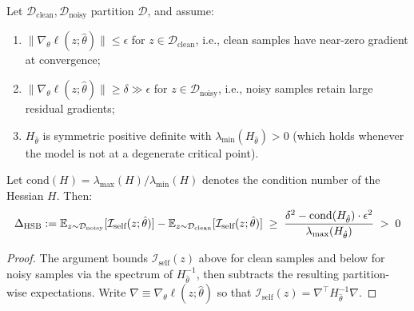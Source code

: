 \begin{foldable} %
    \begin{proposition} \label{prop:hsb}
        Let $\mathcal{D}_\text{clean}, \mathcal{D}_\text{noisy}$ partition $\mathcal{D}$, and assume:
        \begin{enumerate}[label=\textbf{(A\arabic*)},leftmargin=*]
            \item $\|\nabla_\theta \ell(z; \hat{\theta})\| \leq \epsilon$ for $z \in \mathcal{D}_\text{clean}$, i.e., clean samples have near-zero gradient at convergence;
            \item $\|\nabla_\theta \ell(z; \hat{\theta})\| \geq \delta \gg \epsilon$ for $z \in \mathcal{D}_\text{noisy}$, i.e., noisy samples retain large residual gradients;
            \item $H_{\hat\theta}$ is symmetric positive definite with $\lambda_{\min}(H_{\hat\theta}) > 0$ (which holds whenever the model is not at a degenerate critical point).
        \end{enumerate}
        Let $\text{cond}(H) = \lambda_{\max}(H) / \lambda_{\min}(H)$ denotes the condition number of the Hessian $H$.
        Then:
        \begin{equation}
            \Delta_\textup{HSB} := \mathbb{E}_{z \sim \mathcal{D}_\textup{noisy}}[\mathcal{I}_\textup{self}(z;\hat{\theta})]
            - \mathbb{E}_{z \sim \mathcal{D}_\textup{clean}}[\mathcal{I}_\textup{self}(z;\hat{\theta})]
            \;\geq\; \frac{\delta^2 - \text{cond}(H_{\hat{\theta}}) \cdot \epsilon^2}{\lambda_{\max}(H_{\hat{\theta}})}
            \;>\; 0
            \label{eq:hsb}
        \end{equation}
    \end{proposition}
    \begin{proof}
        The argument bounds $\mathcal{I}_\text{self}(z)$ above for clean samples and below for noisy samples via the spectrum of $H_{\hat\theta}^{-1}$, then subtracts the resulting partition-wise expectations.
        Write $\nabla \equiv \nabla_\theta \ell(z;\hat\theta)$ so that $\mathcal{I}_\text{self}(z) = \nabla^\top H_{\hat\theta}^{-1} \nabla$.


\end{proof}
\end{foldable}

